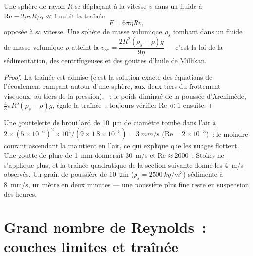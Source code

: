 \begin{proposition}\label{prop:b2:viscous-flows:stokes}
Une sphère de rayon $R$ se déplaçant à la vitesse $v$ dans un fluide à
$\mathrm{Re} = 2\rho vR/\eta \ll 1$ subit la traînée
\[
F = 6\pi\eta Rv ,
\]
opposée à sa vitesse. Une sphère de masse volumique $\rho_s$ tombant dans un fluide
de masse volumique $\rho$ atteint la \emph{} $v_\infty =
\dfrac{2R^2(\rho_s - \rho)g}{9\eta}$ --- c'est la loi de la sédimentation,
des centrifugeuses et des gouttes d'huile de Millikan.
\end{proposition}

\begin{proof}
La traînée est admise (c'est la solution exacte des équations de l'écoulement
rampant autour d'une sphère, aux deux tiers du frottement visqueux, au tiers de
la pression). ~: le poids diminué de la poussée d'Archimède, $\tfrac43\pi R^3(\rho_s -
\rho)g$, égale la traînée~; toujours vérifier $\mathrm{Re} \ll 1$ ensuite.
\end{proof}

\begin{example}\label{ex:b2:viscous-flows:fog}
Une gouttelette de brouillard de \qty{10}{\micro m} de diamètre tombe dans l'air à $2 \times (5 \times
10^{-6})^2 \times 10^4/(9 \times 1.8 \times 10^{-5}) = \qty{3}{mm/s}$ ($\mathrm{Re} = 2 \times
10^{-3}$)~: le moindre courant ascendant la maintient en l'air, ce qui explique que les nuages
flottent. Une goutte de pluie de \qty{1}{mm} donnerait \qty{30}{m/s} et $\mathrm{Re} \approx 2000$~:
Stokes ne s'applique plus, et la traînée quadratique de la section suivante
donne les \qty{4}{m/s} observés. Un grain de poussière de \qty{10}{\micro m} ($\rho_s =
\qty{2500}{kg/m^3}$) sédimente à \qty{8}{mm/s}, un mètre en deux minutes ---
une poussière plus fine reste en suspension des heures.
\end{example}

\section{Grand nombre de Reynolds~: couches limites et traînée}

